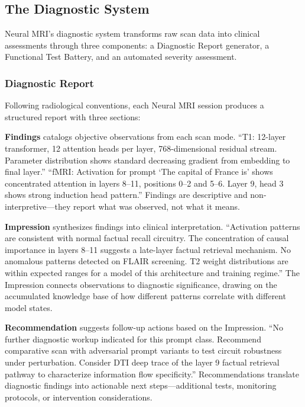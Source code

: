 \documentclass[11pt]{article}
\begin{document}
\subsection{The Diagnostic System}

Neural MRI's diagnostic system transforms raw scan data into clinical assessments through three components: a Diagnostic Report generator, a Functional Test Battery, and an automated severity assessment.

\subsubsection{Diagnostic Report}

Following radiological conventions, each Neural MRI session produces a structured report with three sections:

\textbf{Findings} catalogs objective observations from each scan mode. ``T1: 12-layer transformer, 12 attention heads per layer, 768-dimensional residual stream. Parameter distribution shows standard decreasing gradient from embedding to final layer.'' ``fMRI: Activation for prompt `The capital of France is' shows concentrated attention in layers 8--11, positions 0--2 and 5--6. Layer 9, head 3 shows strong induction head pattern.'' Findings are descriptive and non-interpretive---they report what was observed, not what it means.

\textbf{Impression} synthesizes findings into clinical interpretation. ``Activation patterns are consistent with normal factual recall circuitry. The concentration of causal importance in layers 8--11 suggests a late-layer factual retrieval mechanism. No anomalous patterns detected on FLAIR screening. T2 weight distributions are within expected ranges for a model of this architecture and training regime.'' The Impression connects observations to diagnostic significance, drawing on the accumulated knowledge base of how different patterns correlate with different model states.

\textbf{Recommendation} suggests follow-up actions based on the Impression. ``No further diagnostic workup indicated for this prompt class. Recommend comparative scan with adversarial prompt variants to test circuit robustness under perturbation. Consider DTI deep trace of the layer 9 factual retrieval pathway to characterize information flow specificity.'' Recommendations translate diagnostic findings into actionable next steps---additional tests, monitoring protocols, or intervention considerations.
\end{document}
